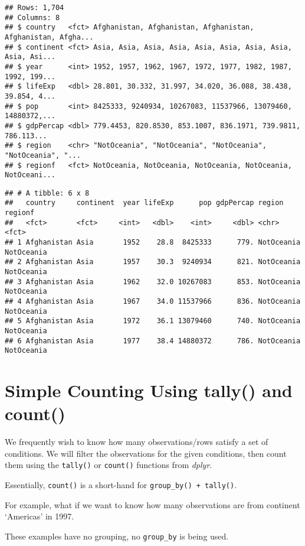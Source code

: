 \documentclass[
]{book}
\begin{document}
\begin{verbatim}
## Rows: 1,704
## Columns: 8
## $ country   <fct> Afghanistan, Afghanistan, Afghanistan, Afghanistan, Afgha...
## $ continent <fct> Asia, Asia, Asia, Asia, Asia, Asia, Asia, Asia, Asia, Asi...
## $ year      <int> 1952, 1957, 1962, 1967, 1972, 1977, 1982, 1987, 1992, 199...
## $ lifeExp   <dbl> 28.801, 30.332, 31.997, 34.020, 36.088, 38.438, 39.854, 4...
## $ pop       <int> 8425333, 9240934, 10267083, 11537966, 13079460, 14880372,...
## $ gdpPercap <dbl> 779.4453, 820.8530, 853.1007, 836.1971, 739.9811, 786.113...
## $ region    <chr> "NotOceania", "NotOceania", "NotOceania", "NotOceania", "...
## $ regionf   <fct> NotOceania, NotOceania, NotOceania, NotOceania, NotOceani...
\end{verbatim}

\begin{verbatim}
## # A tibble: 6 x 8
##   country     continent  year lifeExp      pop gdpPercap region     regionf   
##   <fct>       <fct>     <int>   <dbl>    <int>     <dbl> <chr>      <fct>     
## 1 Afghanistan Asia       1952    28.8  8425333      779. NotOceania NotOceania
## 2 Afghanistan Asia       1957    30.3  9240934      821. NotOceania NotOceania
## 3 Afghanistan Asia       1962    32.0 10267083      853. NotOceania NotOceania
## 4 Afghanistan Asia       1967    34.0 11537966      836. NotOceania NotOceania
## 5 Afghanistan Asia       1972    36.1 13079460      740. NotOceania NotOceania
## 6 Afghanistan Asia       1977    38.4 14880372      786. NotOceania NotOceania
\end{verbatim}

\hypertarget{simple-counting-using-tally-and-count}{%
\section{Simple Counting Using tally() and count()}\label{simple-counting-using-tally-and-count}}

We frequently wish to know how many observations/rows satisfy a set of conditions. We will filter the observations for the given conditions, then count them using the \texttt{tally()} or \texttt{count()} functions from \emph{dplyr}.

Essentially, \texttt{count()} is a short-hand for \texttt{group\_by()\ +\ tally()}.

For example, what if we want to know how many observations are from continent `Americas' in 1997.

These examples have no grouping, no \texttt{group\_by} is being used.
\end{document}
